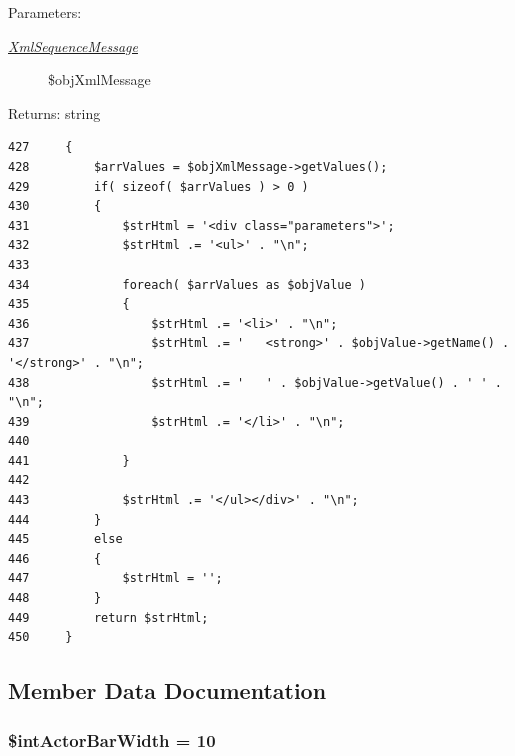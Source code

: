 \begin{Desc}
\item[Parameters:]
\begin{description}
\item[{\em \hyperlink{class_xml_sequence_message}{XmlSequenceMessage}}]\$objXmlMessage \end{description}
\end{Desc}
\begin{Desc}
\item[Returns:]string \end{Desc}


\begin{Code}\begin{verbatim}427     {
428         $arrValues = $objXmlMessage->getValues();
429         if( sizeof( $arrValues ) > 0 )
430         {
431             $strHtml = '<div class="parameters">';
432             $strHtml .= '<ul>' . "\n";
433 
434             foreach( $arrValues as $objValue )
435             {
436                 $strHtml .= '<li>' . "\n";
437                 $strHtml .= '   <strong>' . $objValue->getName() . '</strong>' . "\n";
438                 $strHtml .= '   ' . $objValue->getValue() . ' ' . "\n";
439                 $strHtml .= '</li>' . "\n";
440 
441             }
442 
443             $strHtml .= '</ul></div>' . "\n";
444         }
445         else
446         {
447             $strHtml = '';
448         }
449         return $strHtml;
450     }
\end{verbatim}
\end{Code}




\subsection{Member Data Documentation}
\hypertarget{class_xml_sequence_printer_diagram_f5c27ba6bcbf27e2cf3b05bdf20dcbe4}{
\subsubsection[{\$intActorBarWidth}]{\setlength{\rightskip}{0pt plus 5cm}\$intActorBarWidth = 10}}
\label{class_xml_sequence_printer_diagram_f5c27ba6bcbf27e2cf3b05bdf20dcbe4}


